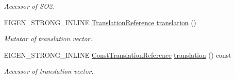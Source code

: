 \begin{DoxyCompactItemize}
\begin{DoxyCompactList}\small\item\em Accessor of S\+O2. \end{DoxyCompactList}\item 
E\+I\+G\+E\+N\+\_\+\+S\+T\+R\+O\+N\+G\+\_\+\+I\+N\+L\+I\+NE \hyperlink{class_eigen_1_1_map_3_01_sophus_1_1_s_e2_group_3_01___scalar_01_4_00_01___options_01_4_a7d845300d37b519b0730cc5ac098f2f2}{Translation\+Reference} \hyperlink{class_eigen_1_1_map_3_01_sophus_1_1_s_e2_group_3_01___scalar_01_4_00_01___options_01_4_a72a936f1dc0808e14b2cbb21ae3835ef}{translation} ()\hypertarget{class_eigen_1_1_map_3_01_sophus_1_1_s_e2_group_3_01___scalar_01_4_00_01___options_01_4_a72a936f1dc0808e14b2cbb21ae3835ef}{}\label{class_eigen_1_1_map_3_01_sophus_1_1_s_e2_group_3_01___scalar_01_4_00_01___options_01_4_a72a936f1dc0808e14b2cbb21ae3835ef}

\begin{DoxyCompactList}\small\item\em Mutator of translation vector. \end{DoxyCompactList}\item 
E\+I\+G\+E\+N\+\_\+\+S\+T\+R\+O\+N\+G\+\_\+\+I\+N\+L\+I\+NE \hyperlink{class_eigen_1_1_map_3_01_sophus_1_1_s_e2_group_3_01___scalar_01_4_00_01___options_01_4_ab7bffb4711a188629b17ae3cb3c03a49}{Const\+Translation\+Reference} \hyperlink{class_eigen_1_1_map_3_01_sophus_1_1_s_e2_group_3_01___scalar_01_4_00_01___options_01_4_a7619bfeaf0e0c601d84b8fcb2f584569}{translation} () const \hypertarget{class_eigen_1_1_map_3_01_sophus_1_1_s_e2_group_3_01___scalar_01_4_00_01___options_01_4_a7619bfeaf0e0c601d84b8fcb2f584569}{}\label{class_eigen_1_1_map_3_01_sophus_1_1_s_e2_group_3_01___scalar_01_4_00_01___options_01_4_a7619bfeaf0e0c601d84b8fcb2f584569}

\begin{DoxyCompactList}\small\item\em Accessor of translation vector. \end{DoxyCompactList}\end{DoxyCompactItemize}
